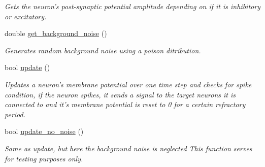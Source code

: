 \begin{DoxyCompactItemize}
\begin{DoxyCompactList}\small\item\em Gets the neuron's post-\/synaptic potential amplitude depending on if it is inhibitory or excitatory. \end{DoxyCompactList}\item 
double \hyperlink{classNeuron_a30b3d50b48ad14d521ad834c813a206a}{get\-\_\-background\-\_\-noise} ()
\begin{DoxyCompactList}\small\item\em Generates random background noise using a poison ditribution. \end{DoxyCompactList}\item 
bool \hyperlink{classNeuron_ade349102c17d508352a1061798083ba2}{update} ()
\begin{DoxyCompactList}\small\item\em Updates a neuron's membrane potential over one time step and checks for spike condition, if the neuron spikes, it sends a signal to the target neurons it is connected to and it's membrane potential is reset to 0 for a certain refractory period. \end{DoxyCompactList}\item 
bool \hyperlink{classNeuron_af285f91a64c661b37f3dc457d6e3a5af}{update\-\_\-no\-\_\-noise} ()
\begin{DoxyCompactList}\small\item\em Same as update, but here the background noise is neglected This function serves for testing purposes only. \end{DoxyCompactList}\end{DoxyCompactItemize}
